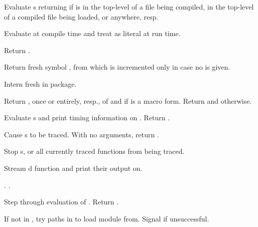 \begin{LIST}{1cm}
  Evaluate s returning  if
   is in the top-level of a file being compiled, in the
  top-level of a compiled file being loaded, or anywhere, resp. 

  Evaluate  at compile time and treat  as literal
  at run time.

  Return .

  Return fresh symbol ,  from
   which is incremented only in case no  is given.

  Intern fresh  in package.

  Return , once or entirely, resp., of  and
  \retvalii{\T} if  is a macro form. 
  Return  and \retval{\NIL} otherwise.

  Evaluate s and print timing information on .
  Return .
  
  Cause s to be traced. With no arguments,
  return .

  Stop s, or all currently traced functions from being traced.

  Stream d function and  print their output on.
  
  . .

  Step through evaluation of . Return . 

  If not in , try paths in  to load
  module from. Signal  if unsuccessful.


\end{LIST}
